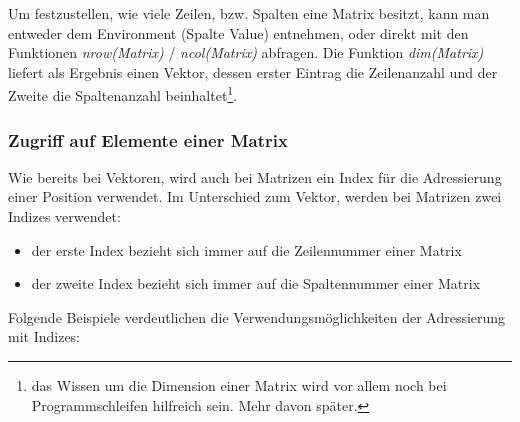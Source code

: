 \documentclass[]{article}
\providecommand{\tightlist}{%
  \setlength{\itemsep}{0pt}\setlength{\parskip}{0pt}}
\let\rmarkdownfootnote\footnote%
\def\footnote{\protect\rmarkdownfootnote}
\begin{document}
Um festzustellen, wie viele Zeilen, bzw. Spalten eine Matrix besitzt,
kann man entweder dem Environment (Spalte Value) entnehmen, oder direkt
mit den Funktionen \emph{nrow(Matrix)} / \emph{ncol(Matrix)} abfragen.
Die Funktion \emph{dim(Matrix)} liefert als Ergebnis einen Vektor,
dessen erster Eintrag die Zeilenanzahl und der Zweite die Spaltenanzahl
beinhaltet\footnote{das Wissen um die Dimension einer Matrix wird vor
  allem noch bei Programmschleifen hilfreich sein. Mehr davon später.}.

\subsubsection*{Zugriff auf Elemente einer
Matrix}\label{zugriff-auf-elemente-einer-matrix}

Wie bereits bei Vektoren, wird auch bei Matrizen ein Index für die
Adressierung einer Position verwendet. Im Unterschied zum Vektor, werden
bei Matrizen zwei Indizes verwendet:

\begin{itemize}
\tightlist
\item
  der erste Index bezieht sich immer auf die Zeilennummer einer Matrix
\item
  der zweite Index bezieht sich immer auf die Spaltennummer einer Matrix
\end{itemize}

Folgende Beispiele verdeutlichen die Verwendungsmöglichkeiten der
Adressierung mit Indizes:
\end{document}
